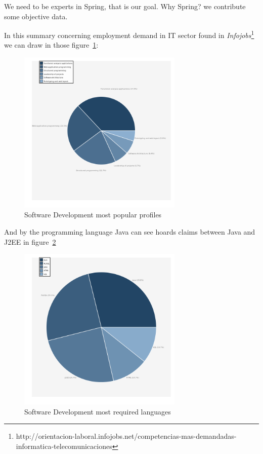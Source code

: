 \documentclass[11pt]{scrartcl}
\begin{document}
\par We need to be experts in Spring, that is our goal. Why Spring? we contribute some objective data.

\par In this summary concerning employment demand in IT sector found in \emph{Infojobs}\footnote{http://orientacion-laboral.infojobs.net/competencias-mas-demandadas-informatica-telecomunicaciones} we can draw in those figure~\ref{fig:req-profiles}:

\begin{figure}[htp]
\begin{center}
  \includegraphics[width=0.7\textwidth]{images/requested-profiles-piechart.png}
  \caption{Software Development most popular profiles}
  \label{fig:req-profiles}
\end{center}
\end{figure}

\par And by the programming language Java can see hoards claims between Java and J2EE in figure~\ref{fig:req-languages}

\begin{figure}[htp]
\begin{center}
  \includegraphics[width=0.7\textwidth]{images/requested-programming-language-piechart.png}
  \caption{Software Development most required languages}
  \label{fig:req-languages}
\end{center}
\end{figure}
\end{document}
